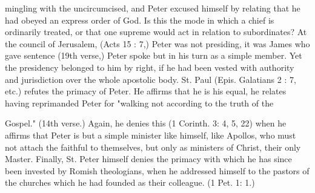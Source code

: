 mingling with the uncircumcised, and Peter excused himself by relating that he had obeyed an express order of God. Is this the mode in which a chief is ordinarily treated, or that one supreme would act in relation to subordinates? At the council of Jerusalem, (Acts 15 : 7,) Peter was not presiding, it was James who gave sentence (19th verse,) Peter spoke but in his turn as a simple member. Yet the presidency belonged to him by right, if he had been vested with authority and jurisdiction over the whole apostolic body. St. Paul (Epis. Galatians 2 : 7, etc.) refutes the primacy of Peter. He affirms that he is his equal, he relates having reprimanded Peter for "walking not according to the truth of the

Gospel." (14th verse.) Again, he denies this (1 Corinth. 3: 4, 5, 22) when he affirms that Peter is but a simple minister like himself, like Apollos, who must not attach the faithful to themselves, but only as ministers of Christ, their only Master. Finally, St. Peter himself denies the primacy with which he has since been invested by Romish theologians, when he addressed himself to the pastors of the churches which he had founded as their colleague. (1 Pet. 1: 1.)


